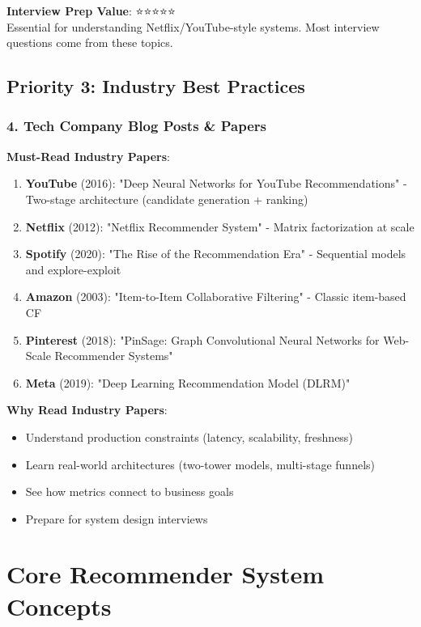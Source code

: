 \documentclass[10pt]{article}
\begin{document}
\textbf{Interview Prep Value}: ⭐⭐⭐⭐⭐ \\
Essential for understanding Netflix/YouTube-style systems. Most interview questions come from these topics.

\subsection{Priority 3: Industry Best Practices}

\subsubsection*{4. Tech Company Blog Posts \& Papers}

\textbf{Must-Read Industry Papers}:
\begin{enumerate}[leftmargin=*]
    \item \textbf{YouTube} (2016): "Deep Neural Networks for YouTube Recommendations" - Two-stage architecture (candidate generation + ranking)
    \item \textbf{Netflix} (2012): "Netflix Recommender System" - Matrix factorization at scale
    \item \textbf{Spotify} (2020): "The Rise of the Recommendation Era" - Sequential models and explore-exploit
    \item \textbf{Amazon} (2003): "Item-to-Item Collaborative Filtering" - Classic item-based CF
    \item \textbf{Pinterest} (2018): "PinSage: Graph Convolutional Neural Networks for Web-Scale Recommender Systems"
    \item \textbf{Meta} (2019): "Deep Learning Recommendation Model (DLRM)"
\end{enumerate}

\textbf{Why Read Industry Papers}:
\begin{itemize}[leftmargin=*]
    \item Understand production constraints (latency, scalability, freshness)
    \item Learn real-world architectures (two-tower models, multi-stage funnels)
    \item See how metrics connect to business goals
    \item Prepare for system design interviews
\end{itemize}

\section{Core Recommender System Concepts}
\end{document}
